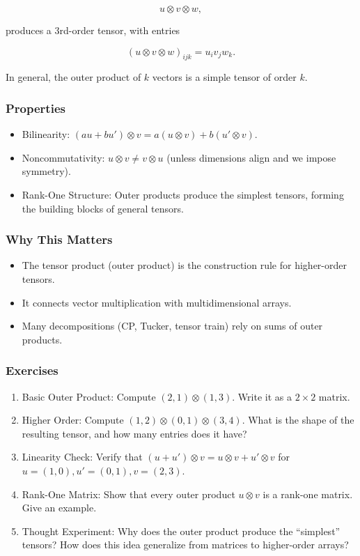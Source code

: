 \documentclass[
  letterpaper,
  DIV=11,
  numbers=noendperiod]{scrreprt}
\providecommand{\tightlist}{%
  \setlength{\itemsep}{0pt}\setlength{\parskip}{0pt}}
\begin{document}
\[
u \otimes v \otimes w,
\]

produces a 3rd-order tensor, with entries

\[
(u \otimes v \otimes w)_{ijk} = u_i v_j w_k.
\]

In general, the outer product of \(k\) vectors is a simple tensor of
order \(k\).

\subsubsection{Properties}\label{properties}

\begin{itemize}
\tightlist
\item
  Bilinearity:
  \((au + bu') \otimes v = a(u \otimes v) + b(u' \otimes v)\).
\item
  Noncommutativity: \(u \otimes v \neq v \otimes u\) (unless dimensions
  align and we impose symmetry).
\item
  Rank-One Structure: Outer products produce the simplest tensors,
  forming the building blocks of general tensors.
\end{itemize}

\subsubsection{Why This Matters}\label{why-this-matters-10}

\begin{itemize}
\tightlist
\item
  The tensor product (outer product) is the construction rule for
  higher-order tensors.
\item
  It connects vector multiplication with multidimensional arrays.
\item
  Many decompositions (CP, Tucker, tensor train) rely on sums of outer
  products.
\end{itemize}

\subsubsection{Exercises}\label{exercises-20}

\begin{enumerate}
\def\labelenumi{\arabic{enumi}.}
\item
  Basic Outer Product: Compute \((2,1) \otimes (1,3)\). Write it as a
  \(2 \times 2\) matrix.
\item
  Higher Order: Compute \((1,2) \otimes (0,1) \otimes (3,4)\). What is
  the shape of the resulting tensor, and how many entries does it have?
\item
  Linearity Check: Verify that
  \((u+u') \otimes v = u \otimes v + u' \otimes v\) for
  \(u=(1,0), u'=(0,1), v=(2,3)\).
\item
  Rank-One Matrix: Show that every outer product \(u \otimes v\) is a
  rank-one matrix. Give an example.
\item
  Thought Experiment: Why does the outer product produce the
  ``simplest'' tensors? How does this idea generalize from matrices to
  higher-order arrays?
\end{enumerate}
\end{document}
